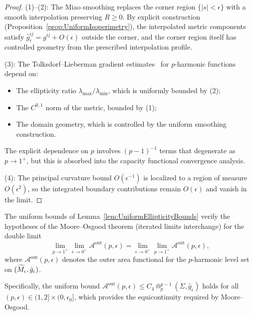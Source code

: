 \begin{proof}
(1)--(2): The Miao smoothing replaces the corner region $\{|s| < \epsilon\}$ with a smooth interpolation preserving $R \ge 0$. By explicit construction (Proposition~\ref{prop:UniformIsoperimetry}), the interpolated metric components satisfy $\hat{g}_\epsilon^{ij} = g^{ij} + O(\epsilon)$ outside the corner, and the corner region itself has controlled geometry from the prescribed interpolation profile.

(3): The Tolksdorf--Lieberman gradient estimates~\cite[Theorem~1.7]{tolksdorf1984} for $p$-harmonic functions depend on:
\begin{itemize}
    \item The ellipticity ratio $\lambda_{\max}/\lambda_{\min}$, which is uniformly bounded by (2);
    \item The $C^{0,1}$ norm of the metric, bounded by (1);
    \item The domain geometry, which is controlled by the uniform smoothing construction.
\end{itemize}
The explicit dependence on $p$ involves $(p-1)^{-1}$ terms that degenerate as $p \to 1^+$, but this is absorbed into the capacity functional convergence analysis.

(4): The principal curvature bound $O(\epsilon^{-1})$ is localized to a region of measure $O(\epsilon^2)$, so the integrated boundary contributions remain $O(\epsilon)$ and vanish in the limit.
\end{proof}

\begin{corollary}\label{cor:MooreOsgood}
The uniform bounds of Lemma~\ref{lem:UniformEllipticityBounds} verify the hypotheses of the Moore--Osgood theorem (iterated limits interchange) for the double limit
\[
\lim_{p \to 1^+} \lim_{\epsilon \to 0^+} \mathscr{A}^{\text{out}}(p, \epsilon) = \lim_{\epsilon \to 0^+} \lim_{p \to 1^+} \mathscr{A}^{\text{out}}(p, \epsilon),
\]
where $\mathscr{A}^{\text{out}}(p, \epsilon)$ denotes the outer area functional for the $p$-harmonic level set on $(\widetilde{M}_\epsilon, \hat{g}_\epsilon)$.

Specifically, the uniform bound $\mathscr{A}^{\text{out}}(p, \epsilon) \le C_4 \Cap_p^{p-1}(\Sigma, \hat{g}_\epsilon)$ holds for all $(p, \epsilon) \in (1,2] \times (0,\epsilon_0]$, which provides the equicontinuity required by Moore--Osgood.
\end{corollary}

